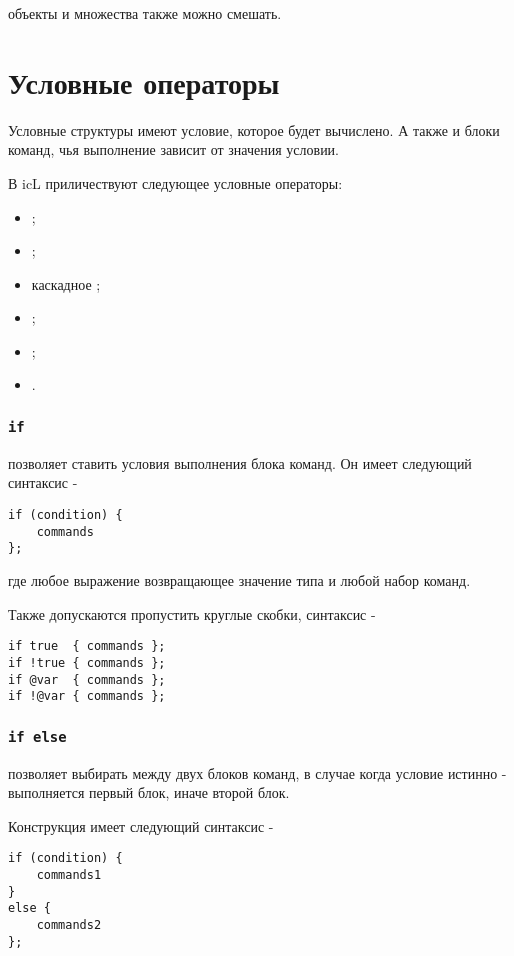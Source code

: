 \documentclass[a4paper, 14pt]{extarticle}
\newenvironment{icItems}
	{ \begin{itemize} [noitemsep,nolistsep] }
	{ \end{itemize} }
\begin{document}
 объекты и множества также можно смешать.

\newpage
\section{Условные операторы}

Условные структуры имеют условие, которое будет вычислено. А также и блоки команд, чья выполнение зависит от значения условии.

В icL приличествуют следующее условные операторы:
\begin{icItems}
	\item {};
	\item {};
	\item каскадное ;
	\item {};
	\item {};
	\item {}.
\end{icItems}

\subsubsection{\lstinline`if`}

 позволяет ставить условия выполнения блока команд. Он имеет следующий синтаксис -
\begin{lstlisting}[numbers=none]
if (condition) {
	commands
};
\end{lstlisting}
где  любое выражение возвращающее значение типа \bool{} и  любой набор команд.

Также допускаются пропустить круглые скобки, синтаксис -
\begin{lstlisting}[numbers=none]
if true  { commands };
if !true { commands };
if @var  { commands };
if !@var { commands };
\end{lstlisting}

\subsubsection{\lstinline`if else`}

 позволяет выбирать между двух блоков команд, в случае когда условие истинно - выполняется первый блок, иначе второй блок.

Конструкция  имеет следующий синтаксис -
\begin{lstlisting}[numbers=none]
if (condition) {
	commands1
}
else {
	commands2
};
\end{lstlisting}
\end{document}
